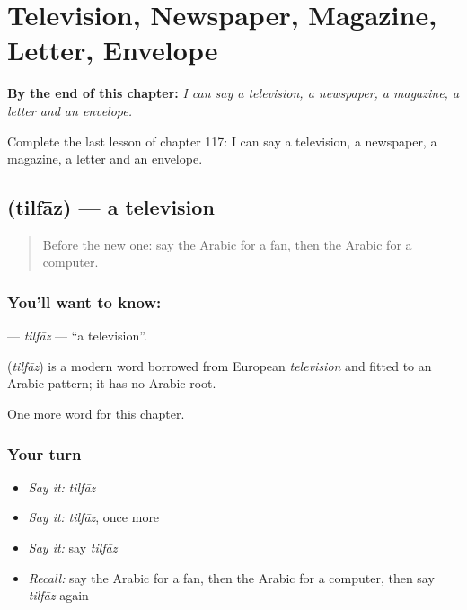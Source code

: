 
\chapter{Television, Newspaper, Magazine, Letter, Envelope}
\label{ch:ar-television-newspaper-magazine-letter-envelope}

\begin{chapteropening}
\textbf{By the end of this chapter:} \emph{I can say a television, a newspaper, a magazine, a letter and an envelope.}

Complete the last lesson of chapter 117: I can say a television, a newspaper, a magazine, a letter and an envelope.
\end{chapteropening}

\section[\texorpdfstring{\ar{تلفاز} (tilfāz)}{تلفاز (tilfāz)}]{ (tilfāz) — a television}

\label{lesson:AR-C117-tilfaz}



\begin{quote}
Before the new one: say the Arabic for a fan, then the Arabic for a computer.
\end{quote}

\subsection*{You'll want to know: }
\textbf{} — \emph{tilfāz} — \textquotedblleft{}a television\textquotedblright{}.

\begin{cousinweb}
\textbf{} (\emph{tilfāz}) is a modern word borrowed from European \emph{television} and fitted to an Arabic pattern; it has no Arabic root.
\end{cousinweb}

\begin{grammarlens}[title={What you've built}]
One more word for this chapter.
\end{grammarlens}

\subsection*{Your turn}
\begin{itemize}
\raggedright
  \item \emph{Say it:} \emph{tilfāz}
  \item \emph{Say it:} \emph{tilfāz}, once more
  \item \emph{Say it:} say \emph{tilfāz}
  \item \emph{Recall:} say the Arabic for a fan, then the Arabic for a computer, then say \emph{tilfāz} again
\end{itemize}

